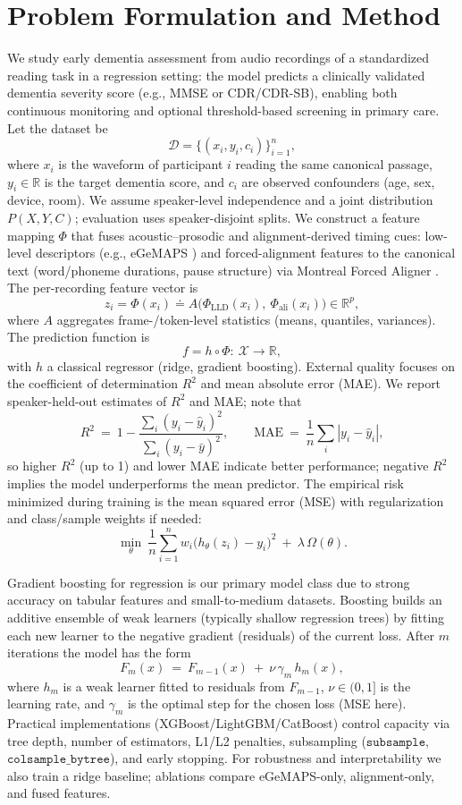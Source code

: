 \documentclass{article}
\begin{document}
\section{Problem Formulation and Method}
We study early dementia assessment from audio recordings of a standardized reading task in a regression setting: the model predicts a clinically validated dementia severity score (e.g., MMSE or CDR/CDR-SB), enabling both continuous monitoring and optional threshold-based screening in primary care. Let the dataset be
$$
\mathcal{D}=\{(x_i,y_i,c_i)\}_{i=1}^n,
$$
where $x_i$ is the waveform of participant $i$ reading the same canonical passage, $y_i\in\mathbb{R}$ is the target dementia score, and $c_i$ are observed confounders (age, sex, device, room). We assume speaker-level independence and a joint distribution $P(X,Y,C)$; evaluation uses speaker-disjoint splits. We construct a feature mapping $\Phi$ that fuses acoustic–prosodic and alignment-derived timing cues: low-level descriptors (e.g., eGeMAPS \citep{gemaps2015}) and forced-alignment features to the canonical text (word/phoneme durations, pause structure) via Montreal Forced Aligner \citep{mfa}. The per-recording feature vector is
$$
z_i=\Phi(x_i)\doteq A\!\Big(\Phi_{\text{LLD}}(x_i),\ \Phi_{\text{ali}}(x_i)\Big)\in\mathbb{R}^p,
$$
where $A$ aggregates frame-/token-level statistics (means, quantiles, variances). The prediction function is
$$
f = h\circ \Phi:\ \mathcal{X}\to\mathbb{R},
$$
with $h$ a classical regressor (ridge, gradient boosting). External quality focuses on the coefficient of determination $R^2$ and mean absolute error (MAE). We report speaker-held-out estimates of $R^2$ and MAE; note that
$$
R^2\ =\ 1 - \frac{\sum_{i}(y_i-\hat{y}_i)^2}{\sum_{i}(y_i-\bar{y})^2},\qquad
\text{MAE}\ =\ \frac{1}{n}\sum_{i}|y_i-\hat{y}_i|,
$$
so higher $R^2$ (up to 1) and lower MAE indicate better performance; negative $R^2$ implies the model underperforms the mean predictor. The empirical risk minimized during training is the mean squared error (MSE) with regularization and class/sample weights if needed:
$$
\min_{\theta}\ \frac{1}{n}\sum_{i=1}^n w_i\big(h_\theta(z_i)-y_i\big)^2\ +\ \lambda\,\Omega(\theta).
$$

Gradient boosting for regression is our primary model class due to strong accuracy on tabular features and small-to-medium datasets. Boosting builds an additive ensemble of weak learners (typically shallow regression trees) by fitting each new learner to the negative gradient (residuals) of the current loss. After $m$ iterations the model has the form
$$
F_m(x)\ =\ F_{m-1}(x)\ +\ \nu\,\gamma_m\,h_m(x),
$$
where $h_m$ is a weak learner fitted to residuals from $F_{m-1}$, $\nu\in(0,1]$ is the learning rate, and $\gamma_m$ is the optimal step for the chosen loss (MSE here). Practical implementations (XGBoost/LightGBM/CatBoost) control capacity via tree depth, number of estimators, L1/L2 penalties, subsampling ($\texttt{subsample}$, $\texttt{colsample\_bytree}$), and early stopping. For robustness and interpretability we also train a ridge baseline; ablations compare eGeMAPS-only, alignment-only, and fused features.
\end{document}
